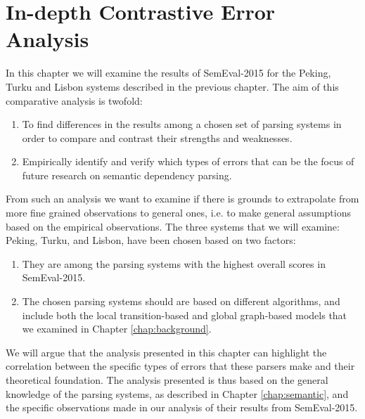 \chapter{In-depth Contrastive Error Analysis}
\label{chap:analysis}




In this chapter we will examine the results of SemEval-2015 for the Peking, Turku and Lisbon systems described in the previous chapter. The aim of this comparative analysis is twofold:

\begin{enumerate}
    \item To find differences in the results among a chosen set of parsing systems in order to compare and contrast their strengths and weaknesses.
    \item Empirically identify and verify which types of errors that can be the focus of future research on semantic dependency parsing.
\end{enumerate}

From such an analysis we want to examine if there is grounds to extrapolate from more fine grained observations to general ones, i.e. to make general assumptions based on the empirical observations. The three systems that we will examine: Peking, Turku, and Lisbon, have been chosen based on two factors:

\begin{enumerate}
    \item They are among the parsing systems with the highest overall scores in SemEval-2015. 
    \item The chosen parsing systems should are based on different algorithms, and include both the local transition-based and global graph-based models that we examined in Chapter \ref{chap:background}.
\end{enumerate}

We will argue that the analysis presented in this chapter can highlight the correlation between the specific types of errors that these parsers make and their theoretical foundation. The analysis presented is thus based on the general knowledge of the parsing systems, as described in Chapter \ref{chap:semantic}, and the specific observations made in our analysis of their results from SemEval-2015.

